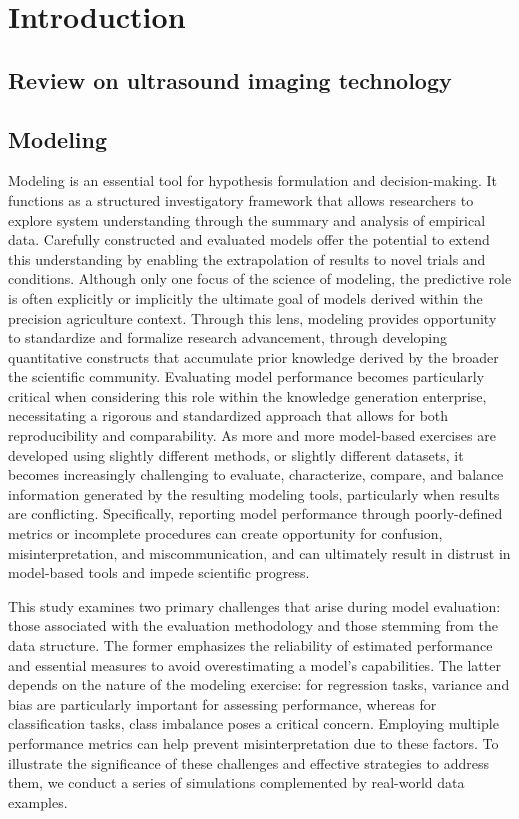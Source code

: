 \section{Introduction}

\subsection{Review on ultrasound imaging technology}

\subsection{Modeling}

Modeling is an essential tool for hypothesis formulation and decision-making. It functions as a structured investigatory framework that allows researchers to explore system understanding through the summary and analysis of empirical data. Carefully constructed and evaluated models offer the potential to extend this understanding by enabling the extrapolation of results to novel trials and conditions. Although only one focus of the science of modeling, the predictive role is often explicitly or implicitly the ultimate goal of models derived within the precision agriculture context. Through this lens, modeling provides opportunity to standardize and formalize research advancement, through developing quantitative constructs that accumulate prior knowledge derived by the broader the scientific community. Evaluating model performance becomes particularly critical when considering this role within the knowledge generation enterprise, necessitating a rigorous and standardized approach that allows for both reproducibility and comparability. As more and more model-based exercises are developed using slightly different methods, or slightly different datasets, it becomes increasingly challenging to evaluate, characterize, compare, and balance information generated by the resulting modeling tools, particularly when results are conflicting. Specifically, reporting model performance through poorly-defined metrics or incomplete procedures can create opportunity for confusion, misinterpretation, and miscommunication, and can ultimately result in distrust in model-based tools and impede scientific progress.

This study examines two primary challenges that arise during model evaluation: those associated with the evaluation methodology and those stemming from the data structure. The former emphasizes the reliability of estimated performance and essential measures to avoid overestimating a model’s capabilities. The latter depends on the nature of the modeling exercise: for regression tasks, variance and bias are particularly important for assessing performance, whereas for classification tasks, class imbalance poses a critical concern. Employing multiple performance metrics can help prevent misinterpretation due to these factors. To illustrate the significance of these challenges and effective strategies to address them, we conduct a series of simulations complemented by real-world data examples.

